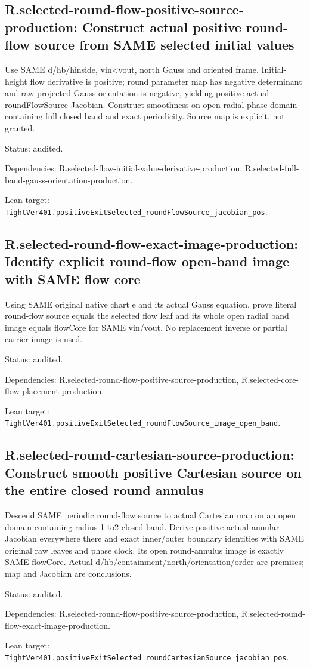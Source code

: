 \documentclass{article}
\begin{document}
\subsection*{R.selected-round-flow-positive-source-production: Construct actual positive round-flow source from SAME selected initial values}
Use SAME d/hb/hinside, vin<vout, north Gauss and oriented frame. Initial-height flow derivative is positive; round parameter map has negative determinant and raw projected Gauss orientation is negative, yielding positive actual roundFlowSource Jacobian. Construct smoothness on open radial-phase domain containing full closed band and exact periodicity. Source map is explicit, not granted.
\par Status: audited.
\par Dependencies: R.selected-flow-initial-value-derivative-production, R.selected-full-band-gauss-orientation-production.
\par Lean target: \texttt{TightVer401.positiveExitSelected\_roundFlowSource\_jacobian\_pos}.
\subsection*{R.selected-round-flow-exact-image-production: Identify explicit round-flow open-band image with SAME flow core}
Using SAME original native chart e and its actual Gauss equation, prove literal round-flow source equals the selected flow leaf and its whole open radial band image equals flowCore for SAME vin/vout. No replacement inverse or partial carrier image is used.
\par Status: audited.
\par Dependencies: R.selected-round-flow-positive-source-production, R.selected-core-flow-placement-production.
\par Lean target: \texttt{TightVer401.positiveExitSelected\_roundFlowSource\_image\_open\_band}.
\subsection*{R.selected-round-cartesian-source-production: Construct smooth positive Cartesian source on the entire closed round annulus}
Descend SAME periodic round-flow source to actual Cartesian map on an open domain containing radius 1-to2 closed band. Derive positive actual annular Jacobian everywhere there and exact inner/outer boundary identities with SAME original raw leaves and phase clock. Its open round-annulus image is exactly SAME flowCore. Actual d/hb/containment/north/orientation/order are premises; map and Jacobian are conclusions.
\par Status: audited.
\par Dependencies: R.selected-round-flow-positive-source-production, R.selected-round-flow-exact-image-production.
\par Lean target: \texttt{TightVer401.positiveExitSelected\_roundCartesianSource\_jacobian\_pos}.
\end{document}

